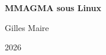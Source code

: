 \begin{titlepage}
\pagecolor[HTML]{0A1A2F}
\color{white}

\vspace*{\fill}

\begin{center}
{\fontsize{60}{72}\selectfont \textbf{MMAGMA sous Linux}}

\vspace{2cm}

{\Large Gilles Maire}

\vspace{0.5cm}

{\large 2026}
\end{center}

\vspace*{\fill}

\end{titlepage}
\clearpage
\nopagecolor

